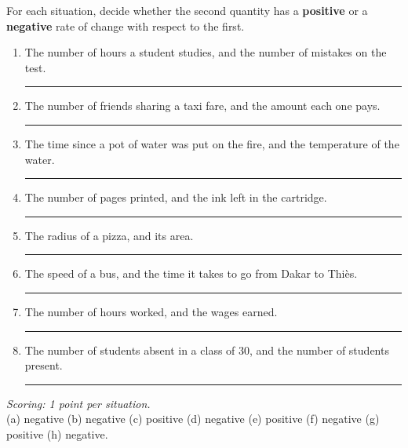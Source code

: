


\begin{exo}{}
For each situation, decide whether the second quantity has a \textbf{positive} or a \textbf{negative} rate of change with respect to the first.
\begin{enumerate}[label=(\alph*),itemsep=2pt]
\item The number of hours a student studies, and the number of mistakes on the test. \ifkey\else\hfill\rule{2.2cm}{0.4pt}\fi
\item The number of friends sharing a taxi fare, and the amount each one pays. \ifkey\else\hfill\rule{2.2cm}{0.4pt}\fi
\item The time since a pot of water was put on the fire, and the temperature of the water. \ifkey\else\hfill\rule{2.2cm}{0.4pt}\fi
\item The number of pages printed, and the ink left in the cartridge. \ifkey\else\hfill\rule{2.2cm}{0.4pt}\fi
\item The radius of a pizza, and its area. \ifkey\else\hfill\rule{2.2cm}{0.4pt}\fi
\item The speed of a bus, and the time it takes to go from Dakar to Thi\`es. \ifkey\else\hfill\rule{2.2cm}{0.4pt}\fi
\item The number of hours worked, and the wages earned. \ifkey\else\hfill\rule{2.2cm}{0.4pt}\fi
\item The number of students absent in a class of 30, and the number of students present. \ifkey\else\hfill\rule{2.2cm}{0.4pt}\fi
\end{enumerate}
\begin{solution}
\textit{Scoring: 1 point per situation.}\\
(a) negative \quad (b) negative \quad (c) positive \quad (d) negative \quad (e) positive \quad (f) negative \quad (g) positive \quad (h) negative.
\end{solution}
\end{exo}

